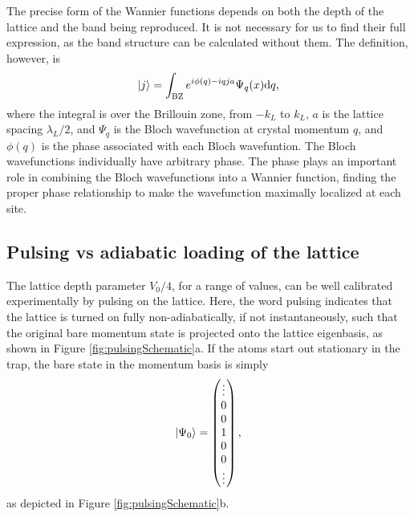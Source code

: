 The precise form of the Wannier functions depends on both the depth of the lattice and the band being reproduced. It is not necessary for us to find their full expression, as the band structure can be calculated without them. The definition, however, is
\begin{equation}
\mathinner{|{j}\rangle} = \int_{\rm BZ} e^{i \phi(q) - i q j a}\Psi_q(x) {\rm d} q,
\end{equation}
where the integral is over the Brillouin zone, from $-k_L$ to $k_L$, $a$ is the lattice spacing $\lambda_L/2$, and $\Psi_q$ is the Bloch wavefunction at crystal momentum $q$, and $\phi(q)$ is the phase associated with each Bloch wavefuntion. The Bloch wavefunctions individually have arbitrary phase. The phase plays an important role in combining the Bloch wavefunctions into a Wannier function, finding the proper phase relationship to make the wavefunction maximally localized at each site\cite{Marzari2012}. 

\subsection{Pulsing vs adiabatic loading of the lattice}\label{sec:LatticeCalib}

The lattice depth parameter $V_0/4$, for a range of values, can be well calibrated experimentally by pulsing on the lattice. Here, the word pulsing indicates that the lattice is turned on fully non-adiabatically, if not instantaneously, such that the original bare momentum state is projected onto the lattice eigenbasis, as shown in Figure \ref{fig:pulsingSchematic}a. If the atoms start out stationary in the trap, the bare state in the momentum basis is simply
\begin{equation}
\mathinner{|{\Psi_0}\rangle} = \begin{pmatrix} \vdots \\
0\\
0\\
1\\
0\\
0\\
\vdots
\end{pmatrix} \\,
\end{equation}
as depicted in  Figure \ref{fig:pulsingSchematic}b.

